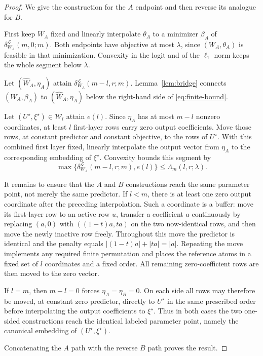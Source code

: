 \documentclass[smallextended,envcountsect]{svjour3}
\begin{document}
\begin{proof}
We give the construction for the $A$ endpoint and then reverse its analogue for $B$.

First keep $W_A$ fixed and linearly interpolate $\theta_A$ to a minimizer $\beta_A$ of $\delta_{W_A}^{\mathcal L}(m,0;m)$. Both endpoints have objective at most $\lambda$, since $(W_A,\theta_A)$ is feasible in that minimization. Convexity in the logit and of the $\ell_1$ norm keeps the whole segment below $\lambda$.

Let $(\widehat W_A,\eta_A)$ attain $\delta_{W_A}^{\mathcal L}(m-l,r;m)$. Lemma~\ref{lem:bridge} connects $(W_A,\beta_A)$ to $(\widehat W_A,\eta_A)$ below the right-hand side of \eqref{eq:finite-bound}.

Let $(U^\star,\xi^\star)\in\mathcal W_l$ attain $e(l)$. Since $\eta_A$ has at most $m-l$ nonzero coordinates, at least $l$ first-layer rows carry zero output coefficients. Move those rows, at constant predictor and constant objective, to the rows of $U^\star$. With this combined first layer fixed, linearly interpolate the output vector from $\eta_A$ to the corresponding embedding of $\xi^\star$. Convexity bounds this segment by
\[
\max\{\delta_{W_A}^{\mathcal L}(m-l,r;m),e(l)\}\le\Lambda_m(l,r;\lambda).
\]

It remains to ensure that the $A$ and $B$ constructions reach the same parameter point, not merely the same predictor. If $l<m$, there is at least one zero output coordinate after the preceding interpolation. Such a coordinate is a buffer: move its first-layer row to an active row $u$, transfer a coefficient $a$ continuously by replacing $(a,0)$ with $((1-t)a,ta)$ on the two now-identical rows, and then move the newly inactive row freely. Throughout this move the predictor is identical and the penalty equals $|(1-t)a|+|ta|=|a|$. Repeating the move implements any required finite permutation and places the reference atoms in a fixed set of $l$ coordinates and a fixed order. All remaining zero-coefficient rows are then moved to the zero vector.

If $l=m$, then $m-l=0$ forces $\eta_A=\eta_B=0$. On each side all rows may therefore be moved, at constant zero predictor, directly to $U^\star$ in the same prescribed order before interpolating the output coefficients to $\xi^\star$. Thus in both cases the two one-sided constructions reach the identical labeled parameter point, namely the canonical embedding of $(U^\star,\xi^\star)$.

Concatenating the $A$ path with the reverse $B$ path proves the result.
\end{proof}
\end{document}
